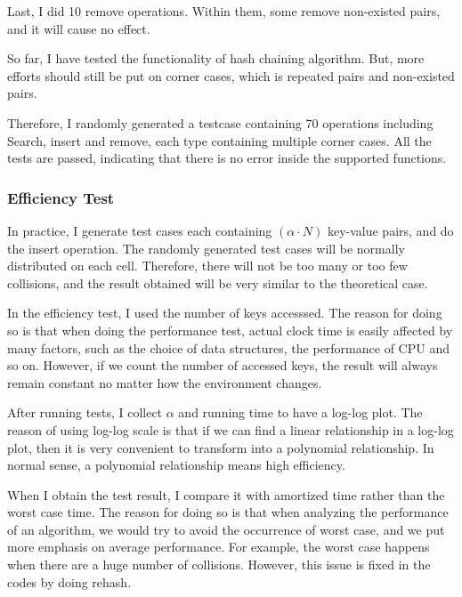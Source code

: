 \documentclass{article}
\begin{document}
\begin{spacing}{1.2}
Last, I did 10 remove operations. Within them, some remove non-existed pairs, and it will cause no effect.

So far, I have tested the functionality of hash chaining algorithm. But, more efforts should still be put on corner cases, which is repeated pairs and non-existed pairs.

Therefore, I randomly generated a testcase containing 70 operations including Search, insert and remove, each type containing multiple corner cases. All the tests are passed, indicating that there is no error inside the supported functions.

\subsubsection{Efficiency Test}
In practice, I generate test cases each containing $(\alpha\cdot N)$ key-value pairs, and do the insert operation. The randomly generated test cases will be normally distributed on each cell. Therefore, there will not be too many or too few collisions, and the result obtained will be very similar to the theoretical case. 

In the efficiency test, I used the number of keys accesssed. The reason for doing so is that when doing the performance test, actual clock time is easily affected by many factors, such as the choice of data structures, the performance of CPU and so on. However, if we count the number of accessed keys, the result will always remain constant no matter how the environment changes.

After running tests, I collect $\alpha$ and running time to have a log-log plot. The reason of using log-log scale is that if we can find a linear relationship in a log-log plot, then it is very convenient to transform into a polynomial relationship. In normal sense, a polynomial relationship means high efficiency.

When I obtain the test result, I compare it with amortized time rather than the worst case time. The reason for doing so is that when analyzing the performance of an algorithm, we would try to avoid the occurrence of worst case, and we put more emphasis on average performance. For example, the worst case happens when there are a huge number of collisions. However, this issue is fixed in the codes by doing rehash.  


\end{spacing}
\end{document}
